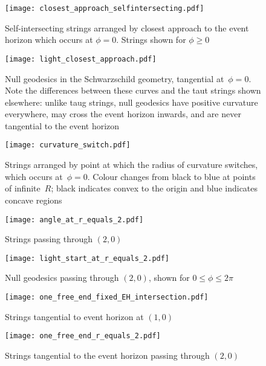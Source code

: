 \documentclass[prb,preprint]{revtex4-1}
\begin{document}
\begin{figure}[p] %
\centering
\texttt{[image: closest\_approach\_selfintersecting.pdf]}
\caption{Self-intersecting strings arranged by closest approach to the
  event horizon which occurs at $\phi=0$.  Strings shown for $\phi\geq
  0$}
\label{closest_approach_self_intersecting}
\end{figure}

\begin{figure}[p] %
\centering
\texttt{[image: light\_closest\_approach.pdf]}
\caption{Null geodesics in the Schwarzschild geometry, tangential
  at~$\phi=0$.  Note the differences between these curves and the taut
  strings shown elsewhere: unlike taug strings, null geodesics have
  positive curvature everywhere, may cross the event horizon inwards,
  and are never tangential to the event horizon}
\label{light_closest_approach}
\end{figure}

\begin{figure}[p]
\centering
\texttt{[image: curvature\_switch.pdf]} %
\caption{Strings arranged by point at which the radius of curvature
  switches, which occurs at~$\phi=0$.  Colour changes from black to
  blue at points of infinite~$R$; black indicates convex to the origin
  and blue indicates concave regions}
\label{curvature_switch}
\end{figure}

\begin{figure}[p]
\centering
\texttt{[image: angle\_at\_r\_equals\_2.pdf]} %
\caption{Strings passing through $(2,0)$}
\label{strings_r_equals_2}
\end{figure}

\begin{figure}[p]
\centering
\texttt{[image: light\_start\_at\_r\_equals\_2.pdf]} %
\caption{Null geodesics passing through $(2,0)$, shown for $0\leq\phi\leq 2\pi$}
\label{light_r_equals_2}
\end{figure}

\begin{figure}[p] %
\centering
\texttt{[image: one\_free\_end\_fixed\_EH\_intersection.pdf]}
\caption{Strings tangential to event horizon at $(1,0)$}
\label{fixed_EH_intersection}
\end{figure}

\begin{figure}[p] %
\centering
\texttt{[image: one\_free\_end\_r\_equals\_2.pdf]}
\caption{Strings tangential to the event horizon passing through $(2,0)$}
\label{one_free_end_r_equals_2}
\end{figure}
\end{document}
